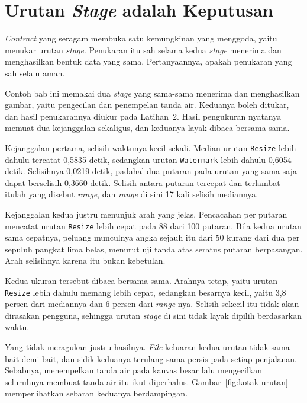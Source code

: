 \section{Urutan \textit{Stage} adalah Keputusan}

\textit{Contract} yang seragam membuka satu kemungkinan yang menggoda, yaitu menukar
urutan \textit{stage}. Penukaran itu sah selama kedua \textit{stage} menerima dan menghasilkan
bentuk data yang sama. Pertanyaannya, apakah penukaran yang sah selalu aman.

Contoh bab ini memakai dua \textit{stage} yang sama-sama menerima dan menghasilkan
gambar, yaitu pengecilan dan penempelan tanda air. Keduanya boleh ditukar, dan
hasil penukarannya diukur pada Latihan~2. Hasil pengukuran nyatanya memuat dua
kejanggalan sekaligus, dan keduanya layak dibaca bersama-sama.

Kejanggalan pertama, selisih waktunya kecil sekali. Median urutan
\texttt{Resize} lebih dahulu tercatat 0,5835 detik, sedangkan urutan
\texttt{Watermark} lebih dahulu 0,6054 detik. Selisihnya 0,0219 detik, padahal
dua putaran pada urutan yang sama saja dapat berselisih 0,3660 detik. Selisih
antara putaran tercepat dan terlambat itulah yang disebut
\textit{range}, dan
\textit{range} di sini 17 kali selisih mediannya.

Kejanggalan kedua justru menunjuk arah yang jelas. Pencacahan per putaran
mencatat urutan \texttt{Resize} lebih cepat pada 88 dari 100 putaran. Bila
kedua urutan sama cepatnya, peluang munculnya angka sejauh itu dari 50 kurang
dari dua per sepuluh pangkat lima belas, menurut uji tanda atas seratus putaran
berpasangan. Arah selisihnya karena itu bukan kebetulan.

Kedua ukuran tersebut dibaca bersama-sama. Arahnya tetap, yaitu urutan
\texttt{Resize} lebih dahulu memang lebih cepat, sedangkan besarnya kecil, yaitu
3,8 persen dari mediannya dan 6 persen dari \textit{range}-nya. Selisih sekecil
itu tidak akan dirasakan pengguna, sehingga urutan \textit{stage} di sini tidak
layak dipilih berdasarkan waktu.

Yang tidak meragukan justru hasilnya. \textit{File} keluaran kedua urutan tidak
sama bait demi bait, dan sidik keduanya terulang sama persis pada setiap
penjalanan. Sebabnya, menempelkan tanda air pada kanvas besar lalu mengecilkan
seluruhnya membuat tanda air itu ikut diperhalus. Gambar~\ref{fig:kotak-urutan}
memperlihatkan sebaran keduanya berdampingan.


